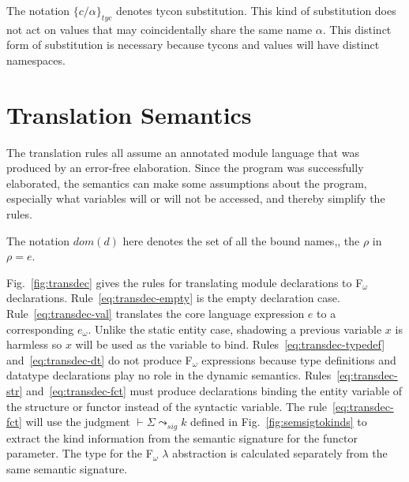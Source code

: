 The notation $\{c/\alpha\}_{tyc}$ denotes tycon substitution. This
kind of substitution does not act on values that may coincidentally
share the same name $\alpha$. This distinct form of substitution is
necessary because tycons and values will have distinct namespaces. 
    
\section{Translation Semantics}
The translation rules all assume an annotated module language that was
produced by an error-free elaboration. Since the program was
successfully elaborated, the semantics can make some assumptions about
the program, especially what variables will or will not be accessed,
and thereby simplify the rules. 



The notation $dom(d)$ here denotes the set of
all the bound names,\ie, the $\rho$ in $\rho=e$. 

Fig.~\ref{fig:transdec} gives the rules for translating module
declarations to F$_\omega$ declarations. Rule~\ref{eq:transdec-empty}
is the empty declaration case. Rule~\ref{eq:transdec-val} translates
the core language expression $e$ to a corresponding $e_\omega$. Unlike
the static entity case, shadowing a previous variable $x$ is harmless
so $x$ will be used as the variable to
bind. Rules~\ref{eq:transdec-typedef} and~\ref{eq:transdec-dt} do not
produce F$_\omega$ expressions because type definitions and datatype
declarations play no role in the
dynamic semantics. Rules~\ref{eq:transdec-str}
and~\ref{eq:transdec-fct} must produce declarations binding the entity
variable of the structure or functor instead of the syntactic
variable. %
The rule~\ref{eq:transdec-fct} will use the judgment $\vdash \Sigma
\leadsto_{sig} k$ defined in Fig.~\ref{fig:semsigtokinds} to extract
the kind information from the semantic signature for the functor
parameter. The type for the F$_\omega$ $\lambda$ abstraction is
calculated separately from the same semantic signature. 

